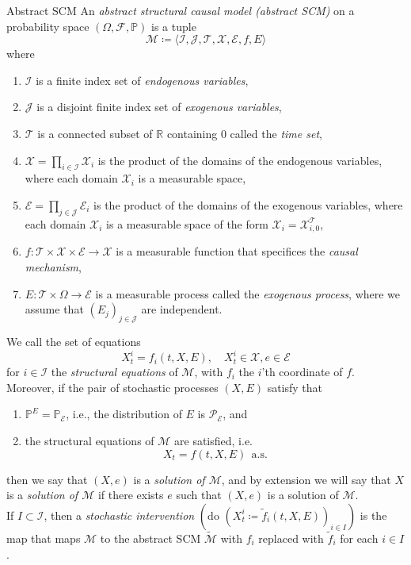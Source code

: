 \documentclass[11pt, a4paper]{memoir}
\theoremstyle{break}
\theoremstyle{break}
\theoremstyle{nonumberplain}
\newcommand{\mR}{\mathbb{R}}
\newcommand{\mP}{\mathbb{P}}
\begin{document}
\begin{mydefinition}{Abstract SCM}
An \emph{abstract structural causal model (abstract SCM)} on a probability space $(\Omega,\mathcal{F},\mP)$ is a tuple
$$\mathcal{M}\coloneqq \langle \mathcal{I},\mathcal{J},\mathcal{T},\mathcal{X},\mathcal{E},f,E\rangle$$
where
\begin{enumerate}[label=\arabic*.]
	\item $\mathcal{I}$ is a finite index set of \emph{endogenous variables},
	\item $\mathcal{J}$ is a disjoint finite index set of \emph{exogenous variables},
	\item $\mathcal{T}$ is a connected subset of $\mR$ containing 0 called the \emph{time set},
	\item $\mathcal{X}=\prod_{i\in \mathcal{I}}\mathcal{X}_i$ is the product of the domains of the endogenous variables, where each domain $\mathcal{X}_i$ is a measurable space,
	\item $\mathcal{E}=\prod_{j\in \mathcal{J}}\mathcal{E}_i$ is the product of the domains of the exogenous variables, where each domain $\mathcal{X}_i$ is a measurable space of the form $\mathcal{X}_i=\mathcal{X}_{i,0}^{\mathcal{T}}$,
	\item $f:\mathcal{T}\times \mathcal{X}\times \mathcal{E}\to\mathcal{X}$ is a measurable function that specifices the \emph{causal mechanism},
	\item $E:\mathcal{T}\times \Omega\to \mathcal{E}$ is a measurable process called the \emph{exogenous process}, where we assume that $(E_j)_{j\in \mathcal{J}}$ are independent.
\end{enumerate}
We call the set of equations
$$X_t^i=f_i(t,X,E),\quad X_t^i\in \mathcal{X},e\in \mathcal{E}$$
for $i\in \mathcal{I}$ the \emph{structural equations} of $\mathcal{M}$, with $f_i$ the $i$'th coordinate of $f$.\\[5pt]
Moreover, if the pair of stochastic processes $(X,E)$ satisfy that
\begin{enumerate}[label=\roman*.]
	\item $\mP^E=\mP_\mathcal{E}$, i.e., the distribution of $E$ is $\mathcal{P}_\mathcal{E}$, and
	\item the structural equations of $\mathcal{M}$ are satisfied, i.e.
	$$X_t=f(t,X,E)\ \ \text{a.s.}$$
\end{enumerate}
then we say that $(X,e)$ is a \emph{solution of $\mathcal{M}$}, and by extension we will say that $X$ is a \emph{solution of $\mathcal{M}$} if there exists $e$ such that $(X,e)$ is a solution of $\mathcal{M}$.\\[5pt]
If  $I\subset \mathcal{I}$, then a \emph{stochastic intervention} $(\text{do } (X_t^i\coloneqq \tilde{f}_i(t,X,E))_{i\in I})$ is the map that maps $\mathcal{M}$ to the abstract SCM $\tilde{\mathcal{M}}$ with $f_i$ replaced with $\tilde{f}_i$ for each $i\in I$.
\end{mydefinition}
\end{document}
